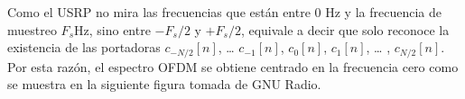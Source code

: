 Como el USRP no mira las frecuencias que están entre 0 Hz y la frecuencia de muestreo $F_{s}$Hz, sino entre $-F_{s}/2$ y $+F_{s}/2$, equivale a decir que solo reconoce la existencia de las portadoras $c_{-N/2}[n]$, … $c_{-1}[n]$, $c_{0}[n]$, $c_{1}[n]$, … , $c_{N/2}[n]$. Por esta razón, el espectro OFDM se obtiene centrado en la frecuencia cero como se muestra en la siguiente figura tomada de GNU Radio. 